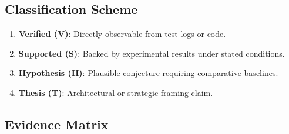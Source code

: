 \documentclass[11pt,a4paper]{article}
\begin{document}
\subsection{Classification Scheme}

\begin{enumerate}[label=\textbf{\arabic*.}]
  \item \textbf{Verified (V)}: Directly observable from test logs or code.
  \item \textbf{Supported (S)}: Backed by experimental results under stated conditions.
  \item \textbf{Hypothesis (H)}: Plausible conjecture requiring comparative baselines.
  \item \textbf{Thesis (T)}: Architectural or strategic framing claim.
\end{enumerate}

\subsection{Evidence Matrix}
\end{document}
